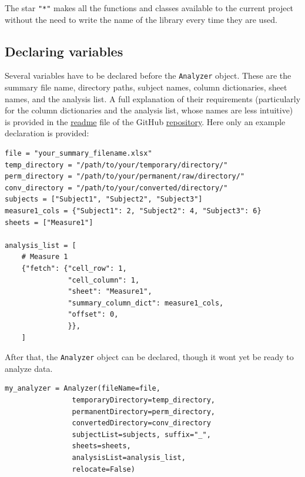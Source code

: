 \documentclass[a4paper,12pt]{article}
\begin{document}
The star \verb|"*"| makes all the functions and classes available to the current project without the need to write the name of the library every time they are used.

\subsection{Declaring variables}

Several variables have to be declared before the \verb|Analyzer| object. These are the summary file name, directory paths, subject names, column dictionaries, sheet names, and the analysis list. A full explanation of their requirements (particularly for the column dictionaries and the analysis list, whose names are less intuitive) is provided in the \href{https://github.com/JuodaanViinaa/Laboratorio/blob/translate/README.md}{readme} file of the GitHub \href{https://github.com/JuodaanViinaa/Laboratorio/tree/translate}{repository}. Here only an example declaration is provided:

\begin{tcolorbox}[
    enhanced,
    attach boxed title to top left={xshift=6mm,yshift=-3mm},
    colback=lightgreen!20,
    colframe=lightgreen,
    colbacktitle=lightgreen,
    title=Python,
    fonttitle=\bfseries\color{black},
    boxed title style={size=small,colframe=lightgreen,sharp corners},
    sharp corners,
    ]
    \begin{verbatim}
file = "your_summary_filename.xlsx"
temp_directory = "/path/to/your/temporary/directory/"
perm_directory = "/path/to/your/permanent/raw/directory/"
conv_directory = "/path/to/your/converted/directory/"
subjects = ["Subject1", "Subject2", "Subject3"]
measure1_cols = {"Subject1": 2, "Subject2": 4, "Subject3": 6}
sheets = ["Measure1"]

analysis_list = [
    # Measure 1
    {"fetch": {"cell_row": 1,
               "cell_column": 1,
               "sheet": "Measure1",
               "summary_column_dict": measure1_cols,
               "offset": 0,
               }},
    ]
    \end{verbatim}
\end{tcolorbox}

After that, the \verb|Analyzer| object can be declared, though it wont yet be ready to analyze data.

\begin{tcolorbox}[
    enhanced,
    attach boxed title to top left={xshift=6mm,yshift=-3mm},
    colback=lightgreen!20,
    colframe=lightgreen,
    colbacktitle=lightgreen,
    title=Python,
    fonttitle=\bfseries\color{black},
    boxed title style={size=small,colframe=lightgreen,sharp corners},
    sharp corners,
    ]
    \begin{verbatim}
my_analyzer = Analyzer(fileName=file,
                temporaryDirectory=temp_directory,
                permanentDirectory=perm_directory,
                convertedDirectory=conv_directory
                subjectList=subjects, suffix="_",
                sheets=sheets,
                analysisList=analysis_list,
                relocate=False)
    \end{verbatim}
\end{tcolorbox}
\end{document}
